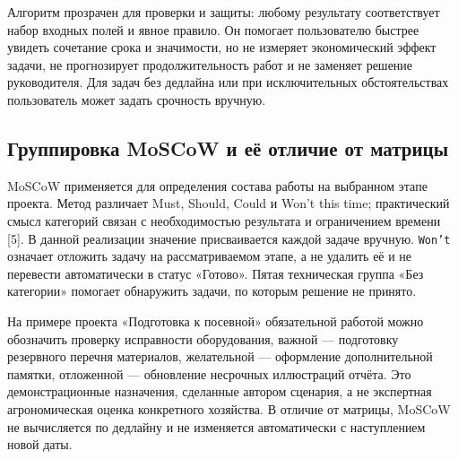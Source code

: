 \documentclass[14pt,a4paper]{extarticle}
\begin{document}
Алгоритм прозрачен для проверки и защиты: любому результату соответствует набор входных полей и явное правило. Он помогает пользователю быстрее увидеть сочетание срока и значимости, но не измеряет экономический эффект задачи, не прогнозирует продолжительность работ и не заменяет решение руководителя. Для задач без дедлайна или при исключительных обстоятельствах пользователь может задать срочность вручную.

\subsection{Группировка MoSCoW и её отличие от матрицы}

MoSCoW применяется для определения состава работы на выбранном этапе проекта. Метод различает Must, Should, Could и Won't this time; практический смысл категорий связан с необходимостью результата и ограничением времени {[}5{]}. В данной реализации значение присваивается каждой задаче вручную. \texttt{Won’t} означает отложить задачу на рассматриваемом этапе, а не удалить её и не перевести автоматически в статус «Готово». Пятая техническая группа «Без категории» помогает обнаружить задачи, по которым решение не принято.

На примере проекта «Подготовка к посевной» обязательной работой можно обозначить проверку исправности оборудования, важной --- подготовку резервного перечня материалов, желательной --- оформление дополнительной памятки, отложенной --- обновление несрочных иллюстраций отчёта. Это демонстрационные назначения, сделанные автором сценария, а не экспертная агрономическая оценка конкретного хозяйства. В отличие от матрицы, MoSCoW не вычисляется по дедлайну и не изменяется автоматически с наступлением новой даты.
\end{document}
